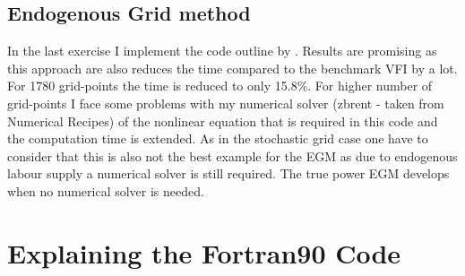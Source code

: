 \documentclass[a4paper,12pt]{article}
\begin{document}
\subsection*{Endogenous Grid method}

In the last exercise I implement the code outline by . Results are promising as this approach are also reduces the time compared to the benchmark VFI by a lot. For 1780 grid-points the time is reduced to only 15.8\%. For higher number of grid-points I face some problems with my numerical solver (zbrent - taken from Numerical Recipes) of the nonlinear equation that is required in this code and the computation time is extended. As in the stochastic grid case one have to consider that this is also not the best example for the EGM as due to endogenous labour supply a numerical solver is still required. The true power EGM develops when no numerical solver is needed. 

\section*{Explaining the Fortran90 Code}
\end{document}
